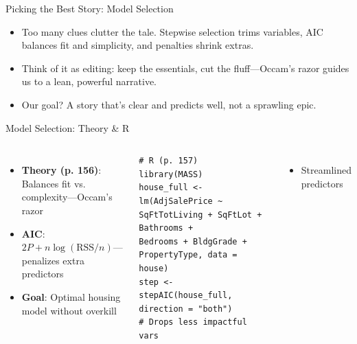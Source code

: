 \documentclass{beamer}
\begin{document}
	\begin{frame}{Picking the Best Story: Model Selection}
		\begin{itemize}
			\item Too many clues clutter the tale. Stepwise selection trims variables, AIC balances fit and simplicity, and penalties shrink extras.
			\item Think of it as editing: keep the essentials, cut the fluff—Occam’s razor guides us to a lean, powerful narrative.
			\item Our goal? A story that’s clear and predicts well, not a sprawling epic.
		\end{itemize}
	\end{frame}	
	
	\begin{frame}[fragile]{Model Selection: Theory \& R}
		\begin{columns}
			\begin{itemize}
				\item \textbf{Theory (p. 156)}: Balances fit vs. complexity—Occam’s razor
				\item \textbf{AIC}: $2P + n\log(\text{RSS}/n)$—penalizes extra predictors
				\item \textbf{Goal}: Optimal housing model without overkill
			\end{itemize}
			\begin{lstlisting}
# R (p. 157)
library(MASS)
house_full <- lm(AdjSalePrice ~ SqFtTotLiving + SqFtLot + Bathrooms +
Bedrooms + BldgGrade + PropertyType, data = house)
step <- stepAIC(house_full, direction = "both")
# Drops less impactful vars
			\end{lstlisting}
			\begin{itemize}
				\item Streamlined predictors
			\end{itemize}
		\end{columns}
	\end{frame}
\end{document}
